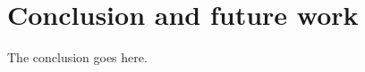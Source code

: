 \documentclass[10pt,journal,compsoc]{IEEEtran}
\begin{document}
%




\section{Conclusion and future work}
The conclusion goes here.





\end{document}
